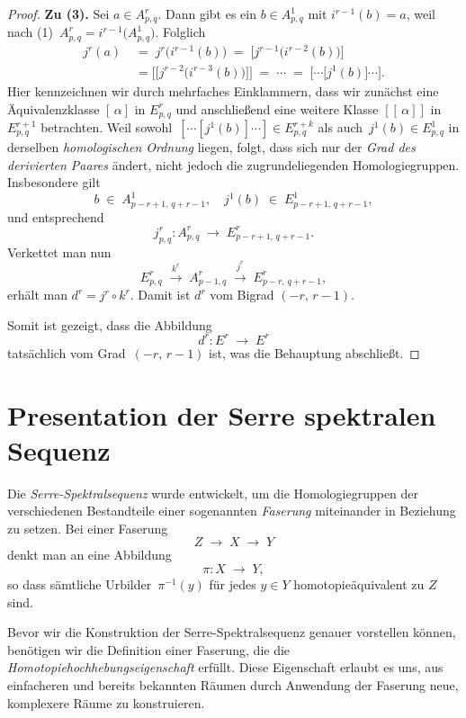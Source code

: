 \documentclass[12pt, hidelinks]{article}
\numberwithin{conj}{section}
\begin{document}
\begin{proof}
\smallskip
\noindent
\textbf{Zu (3).} Sei \(a \in A^r_{p,q}\). Dann gibt es ein \(b \in A^1_{p,q}\) mit \(i^{r-1}(b) = a\), weil nach (1) \(\,A^r_{p,q} = i^{r-1}\bigl(A^1_{p,q}\bigr)\). Folglich
\begin{align}
    j^r(a)
    &\;=\;
    j^r\bigl(i^{r-1}(b)\bigr)
    \;=\;
    \bigl[j^{r-1}\bigl(i^{r-2}(b)\bigr)\bigr] \\\nonumber
    &\;= \bigl[\bigl[j^{r-2}\bigl(i^{r-3}(b)\bigr)\bigr]\bigr]
    \;=\;
    \cdots
    \;=\;
    \bigl[\cdots \bigl[j^1(b)\bigr]\cdots\bigr].
\end{align}
Hier kennzeichnen wir durch mehrfaches Einklammern, dass wir zunächst eine Äquivalenzklasse \([\,\alpha]\) in \(E^r_{p,q}\) und anschließend eine weitere Klasse \([[\,\alpha]]\) in \(E^{r+1}_{p,q}\) betrachten. Weil sowohl
\(\,[\cdots [j^1(b)] \cdots] \in E^{r+k}_{p,q}\) 
als auch 
\(\,j^1(b) \in E^1_{p,q}\)
in derselben \emph{homologischen Ordnung} liegen, folgt, dass sich nur der \emph{Grad des derivierten Paares} ändert, nicht jedoch die zugrundeliegenden Homologiegruppen. Insbesondere gilt
\[
    b \;\in\; A^1_{p-r+1,\,q+r-1},
    \quad
    j^1(b) \;\in\; E^1_{p-r+1,\,q+r-1},
\]
und entsprechend
\[
    j^r_{p,q} : A^r_{p,q} \;\longrightarrow\; E^r_{p-r+1,\,q+r-1}.
\]
Verkettet man nun
\[
    E^r_{p,q} \;\xrightarrow{k^r}\; A^r_{p-1,q}
    \;\xrightarrow{j^r}\; E^r_{p-r,\,q+r-1},
\]
erhält man \(d^r = j^r \circ k^r\). Damit ist \(d^r\) vom Bigrad \((-r,\,r-1)\).

\bigskip

\noindent
Somit ist gezeigt, dass die Abbildung
\[
    d^r : E^r \;\longrightarrow\; E^r
\]
tatsächlich vom Grad \(\,(-r,\,r-1)\) ist, was die Behauptung abschließt.
\end{proof}

\section{Presentation der Serre spektralen Sequenz}
Die \emph{Serre-Spektralsequenz} wurde entwickelt, um die Homologiegruppen der verschiedenen Bestandteile einer sogenannten \emph{Faserung} miteinander in Beziehung zu setzen. Bei einer Faserung 
\[
    Z \;\longrightarrow\; X \;\longrightarrow\; Y
\]
denkt man an eine Abbildung 
\[
    \pi : X \;\longrightarrow\; Y,
\]
so dass sämtliche Urbilder \(\,\pi^{-1}(y)\) für jedes \(y \in Y\) homotopieäquivalent zu \(Z\) sind. 

Bevor wir die Konstruktion der Serre-Spektralsequenz genauer vorstellen können, benötigen wir die Definition einer Faserung, die die \emph{Homotopiehochhebungseigenschaft} erfüllt. Diese Eigenschaft erlaubt es uns, aus einfacheren und bereits bekannten Räumen durch Anwendung der Faserung neue, komplexere Räume zu konstruieren. 
\end{document}
